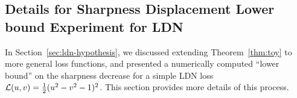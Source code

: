 







\clearpage
\subsection{Details for Sharpness Displacement Lower bound Experiment for LDN}
\label{sec:LDNLBdetails}

In Section~\ref{sec:ldn-hypothesis}, we discussed extending Theorem~\ref{thm:toy} to more general loss functions, and presented a numerically computed ``lower bound'' on the sharpness decrease for a simple LDN loss ${\mathcal{L}}(u,v) = \frac{1}{2}(u^2-v^2-1)^2$. This section provides more details of this process.


